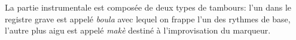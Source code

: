 \documentclass[12pt, fleqn]{extarticle}
\begin{document}
\bigskip
\par
La partie instrumentale est composée de deux types de tambours: l'un dans le registre grave est appelé \textit{boula} avec lequel on frappe l'un des rythmes de base, l'autre plus aigu est appelé \textit{makè} destiné à l'improvisation du marqueur.


\bigskip
\bigskip
\small
\clearpage
{}
\bigskip
\bigskip
 
\end{document}
